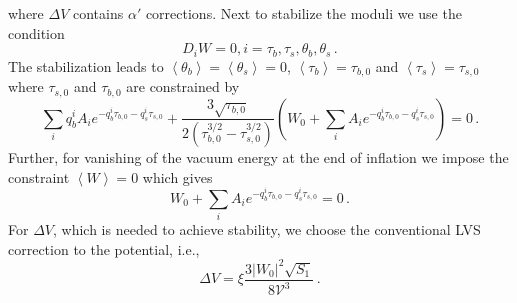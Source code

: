 \documentclass[12pt]{article}
\begin{document}
where $\Delta V$ contains $\alpha'$ corrections.
Next to stabilize the moduli we use the condition
\begin{equation}
  D_i W = 0, i = \tau_b, \tau_s, \theta_b, \theta_s\,.
\end{equation}
The stabilization leads to $\left<\theta_b\right> = \left<\theta_s\right> = 0$, $\left<\tau_b\right> = \tau_{b, 0}$ and $\left<\tau_s\right> = \tau_{s, 0}$ where $\tau_{s, 0}$ and $\tau_{b, 0}$ are constrained by
\begin{equation} \label{eq:LVS:stabilization}
  \sum_i q^i_b A_i e^{-q_b^i \tau_{b, 0} - q^i_s \tau_{s, 0}}
  + \frac{3 \sqrt{\tau_{b, 0}}}{2 \left(\tau^{3 / 2}_{b, 0} - \tau^{3 / 2}_{s, 0}\right)} \left(
    W_0 + \sum_i A_i e^{-q^i_b \tau_{b, 0} - q_s^i \tau_{s, 0}}
  \right) = 0\,.
\end{equation}
Further, for vanishing of the vacuum energy at the end of inflation we impose the constraint $\left<W\right> = 0$ which gives
\begin{equation}
  W_0 + \sum_i A_i e^{-q_b^i \tau_{b, 0} - q_s^i \tau_{s, 0}} = 0\,.
\end{equation}
For $\Delta V$, which is needed to achieve stability, we choose the conventional LVS correction to the potential, i.e.,
\begin{equation}
  \Delta V = \xi \frac{3 \left|W_0\right|^2 \sqrt{S_1}}{8 \mathcal{V}^3}\,.
\end{equation}

\end{document}
